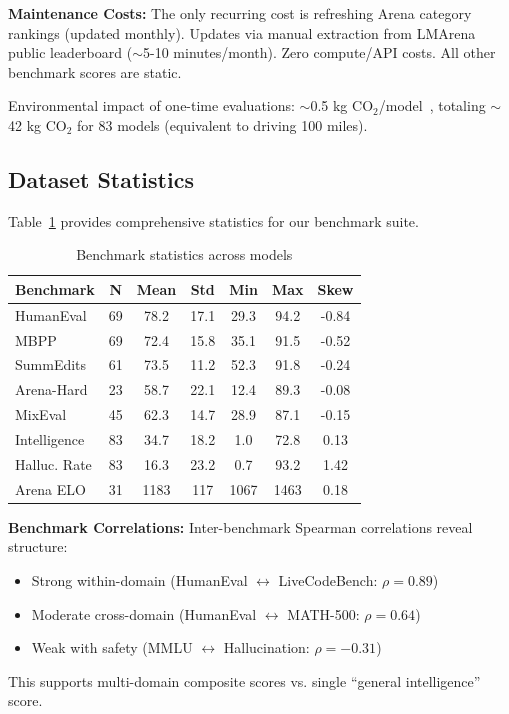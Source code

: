 \textbf{Maintenance Costs:} The only recurring cost is refreshing Arena category rankings (updated monthly). Updates via manual extraction from LMArena public leaderboard ($\sim$5-10 minutes/month). Zero compute/API costs. All other benchmark scores are static.

Environmental impact of one-time evaluations: $\sim$0.5 kg CO$_2$/model~\cite{patterson2021carbon}, totaling $\sim$42 kg CO$_2$ for 83 models (equivalent to driving 100 miles).

\subsection{Dataset Statistics}

Table~\ref{tab:benchmark-stats} provides comprehensive statistics for our benchmark suite.

\begin{table}[t]
\centering
\caption{Benchmark statistics across models}
\label{tab:benchmark-stats}
\small
\begin{tabular}{lcccccc}
\toprule
\textbf{Benchmark} & \textbf{N} & \textbf{Mean} & \textbf{Std} & \textbf{Min} & \textbf{Max} & \textbf{Skew} \\
\midrule
HumanEval & 69 & 78.2 & 17.1 & 29.3 & 94.2 & -0.84 \\
MBPP & 69 & 72.4 & 15.8 & 35.1 & 91.5 & -0.52 \\
SummEdits & 61 & 73.5 & 11.2 & 52.3 & 91.8 & -0.24 \\
Arena-Hard & 23 & 58.7 & 22.1 & 12.4 & 89.3 & -0.08 \\
MixEval & 45 & 62.3 & 14.7 & 28.9 & 87.1 & -0.15 \\
Intelligence & 83 & 34.7 & 18.2 & 1.0 & 72.8 & 0.13 \\
Halluc. Rate & 83 & 16.3 & 23.2 & 0.7 & 93.2 & 1.42 \\
Arena ELO & 31 & 1183 & 117 & 1067 & 1463 & 0.18 \\
\bottomrule
\end{tabular}
\end{table}

\textbf{Benchmark Correlations:} Inter-benchmark Spearman correlations reveal structure:
%
\begin{itemize}[nosep]
\item Strong within-domain (HumanEval $\leftrightarrow$ LiveCodeBench: $\rho = 0.89$)
\item Moderate cross-domain (HumanEval $\leftrightarrow$ MATH-500: $\rho = 0.64$)
\item Weak with safety (MMLU $\leftrightarrow$ Hallucination: $\rho = -0.31$)
\end{itemize}
%
This supports multi-domain composite scores vs. single ``general intelligence'' score.

